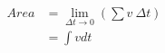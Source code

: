 \documentclass[preview]{standalone}
\begin{document}
\begin{align*}
Area&=\lim_{\Delta t\to 0} (\sum v \ \Delta t ) \\ &=\int v dt
\end{align*}
\end{document}
